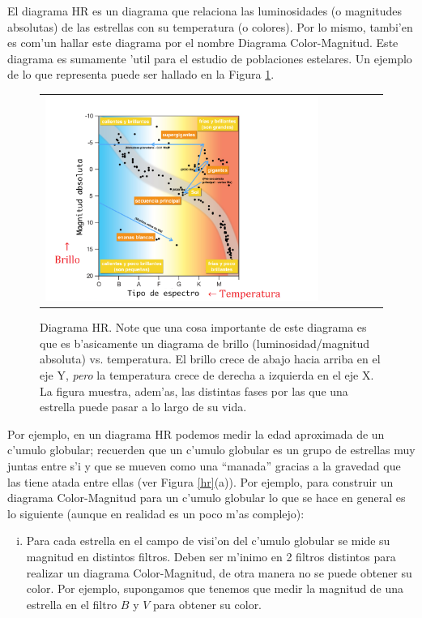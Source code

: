 \documentclass{article}
\begin{document}
\begin{enumerate}[a)]
El diagrama HR es un diagrama que relaciona las luminosidades (o magnitudes absolutas) de las estrellas con su temperatura (o colores). Por lo mismo, tambi'en es com'un hallar este diagrama por el nombre Diagrama Color-Magnitud. Este diagrama es sumamente 'util para el estudio de poblaciones estelares. Un ejemplo de lo que representa puede ser hallado en la Figura \ref{hr_diagr}.

\begin{figure}[!ht]
\begin{center}
\begin{tabular}{ll}
  \includegraphics[width=0.85\textwidth]{diagrama_hr.png} 
\end{tabular}
\caption{{\small Diagrama HR. Note que una cosa importante de este diagrama es que es b'asicamente un diagrama de brillo (luminosidad/magnitud absoluta) vs. temperatura. El brillo crece de abajo hacia arriba en el eje Y, \emph{pero} la temperatura crece de derecha a izquierda en el eje X. La figura muestra, adem'as, las distintas fases por las que una estrella puede pasar a lo largo de su vida.}}\label{hr_diagr}
\end{center} 
\end{figure}

Por ejemplo, en un diagrama HR podemos medir la edad aproximada de un c'umulo globular; recuerden que un c'umulo globular es un grupo de estrellas muy juntas entre s'i y que se mueven como una ``manada'' gracias a la gravedad que las tiene atada entre ellas (ver Figura \ref{hr}(a)). Por ejemplo, para construir un diagrama Color-Magnitud para un c'umulo globular lo que se hace en general es lo siguiente (aunque en realidad es un poco m'as complejo):

\begin{enumerate} [i)]
\item Para cada estrella en el campo de visi'on del c'umulo globular se mide su magnitud en distintos filtros. Deben ser m'inimo en 2 filtros distintos para realizar un diagrama Color-Magnitud, de otra manera no se puede obtener su color. Por ejemplo, supongamos que tenemos que medir la magnitud de una estrella en el filtro $B$ y $V$ para obtener su color.


\end{enumerate}
\end{enumerate}
\end{document}
